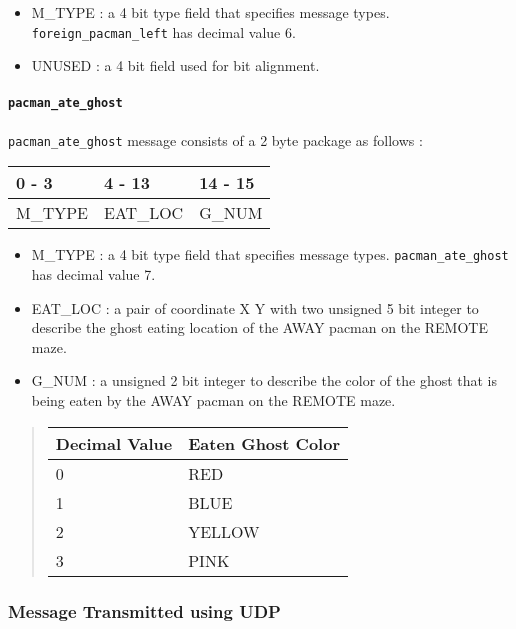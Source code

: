 \documentclass[]{article}
\let\oldparagraph\paragraph
\renewcommand{\paragraph}[1]{\oldparagraph{#1}\mbox{}}
\begin{document}
\begin{itemize}
\item
  M\_TYPE : a 4 bit type field that specifies message types.
  \texttt{foreign\_pacman\_left} has decimal value 6.
\item
  UNUSED : a 4 bit field used for bit alignment.
\end{itemize}

\hypertarget{pacman_ate_ghost}{%
\paragraph{\texorpdfstring{\texttt{pacman\_ate\_ghost}}{pacman\_ate\_ghost}}\label{pacman_ate_ghost}}

\texttt{pacman\_ate\_ghost} message consists of a 2 byte package as
follows :

\begin{longtable}[]{@{}lll@{}}
\toprule
0 - 3 & 4 - 13 & 14 - 15\tabularnewline
\midrule
\endhead
M\_TYPE & EAT\_LOC & G\_NUM\tabularnewline
\bottomrule
\end{longtable}

\begin{itemize}
\item
  M\_TYPE : a 4 bit type field that specifies message types.
  \texttt{pacman\_ate\_ghost} has decimal value 7.
\item
  EAT\_LOC : a pair of coordinate X Y with two unsigned 5 bit integer to
  describe the ghost eating location of the AWAY pacman on the REMOTE
  maze.
\item
  G\_NUM : a unsigned 2 bit integer to describe the color of the ghost
  that is being eaten by the AWAY pacman on the REMOTE maze.
\end{itemize}

\begin{quote}
\begin{longtable}[]{@{}ll@{}}
\toprule
Decimal Value & Eaten Ghost Color\tabularnewline
\midrule
\endhead
0 & RED\tabularnewline
1 & BLUE\tabularnewline
2 & YELLOW\tabularnewline
3 & PINK\tabularnewline
\bottomrule
\end{longtable}
\end{quote}

\hypertarget{message-transmitted-using-udp}{%
\subsubsection{Message Transmitted using
UDP}\label{message-transmitted-using-udp}}
\end{document}
